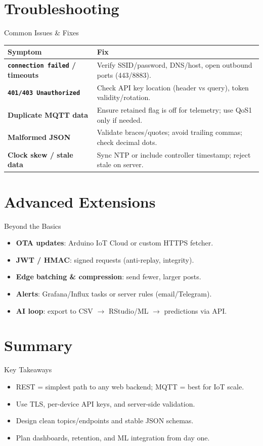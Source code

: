 \documentclass[aspectratio=169]{beamer}
\begin{document}
\section{Troubleshooting}
\begin{frame}{Common Issues \& Fixes}
\begin{tabular}{>{\bfseries}m{4.2cm} m{8.6cm}}
Symptom & Fix \\
\midrule
\texttt{connection failed} / timeouts & Verify SSID/password, DNS/host, open outbound ports (443/8883). \\
\texttt{401/403 Unauthorized} & Check API key location (header vs query), token validity/rotation. \\
Duplicate MQTT data & Ensure retained flag is off for telemetry; use QoS1 only if needed. \\
Malformed JSON & Validate braces/quotes; avoid trailing commas; check decimal dots. \\
Clock skew / stale data & Sync NTP or include controller timestamp; reject stale on server. \\
\end{tabular}
\end{frame}

\section{Advanced Extensions}
\begin{frame}{Beyond the Basics}
\begin{itemize}
  \item \textbf{OTA updates}: Arduino IoT Cloud or custom HTTPS fetcher.
  \item \textbf{JWT / HMAC}: signed requests (anti-replay, integrity).
  \item \textbf{Edge batching \& compression}: send fewer, larger posts.
  \item \textbf{Alerts}: Grafana/Influx tasks or server rules (email/Telegram).
  \item \textbf{AI loop}: export to CSV $\rightarrow$ RStudio/ML $\rightarrow$ predictions via API.
\end{itemize}
\end{frame}

\section{Summary}
\begin{frame}{Key Takeaways}
\begin{itemize}
  \item REST = simplest path to any web backend; MQTT = best for IoT scale.
  \item Use TLS, per-device API keys, and server-side validation.
  \item Design clean topics/endpoints and stable JSON schemas.
  \item Plan dashboards, retention, and ML integration from day one.
\end{itemize}
\end{frame}
\end{document}
